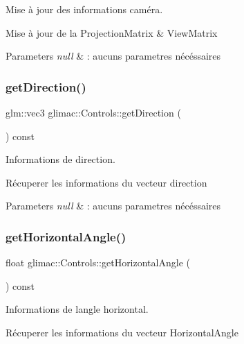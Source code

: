 Mise à jour des informations caméra. 

Mise à jour de la Projection\+Matrix \& View\+Matrix


\begin{DoxyParams}{Parameters}
{\em null} & \+: aucuns parametres nécéssaires \\
\hline
\end{DoxyParams}
\mbox{\label{classglimac_1_1Controls_ac81c1ccf8bf86916d6dc02d24dc2560a}} 
\subsubsection{\texorpdfstring{get\+Direction()}{getDirection()}}
{\footnotesize\ttfamily glm\+::vec3 glimac\+::\+Controls\+::get\+Direction (\begin{DoxyParamCaption}{ }\end{DoxyParamCaption}) const}



Informations de direction. 

Récuperer les informations du vecteur direction


\begin{DoxyParams}{Parameters}
{\em null} & \+: aucuns parametres nécéssaires \\
\hline
\end{DoxyParams}
\mbox{\label{classglimac_1_1Controls_a42dbb28b56c2175f7a2fe5f893c91922}} 
\subsubsection{\texorpdfstring{get\+Horizontal\+Angle()}{getHorizontalAngle()}}
{\footnotesize\ttfamily float glimac\+::\+Controls\+::get\+Horizontal\+Angle (\begin{DoxyParamCaption}{ }\end{DoxyParamCaption}) const}



Informations de l\textquotesingle{}angle horizontal. 

Récuperer les informations du vecteur Horizontal\+Angle



